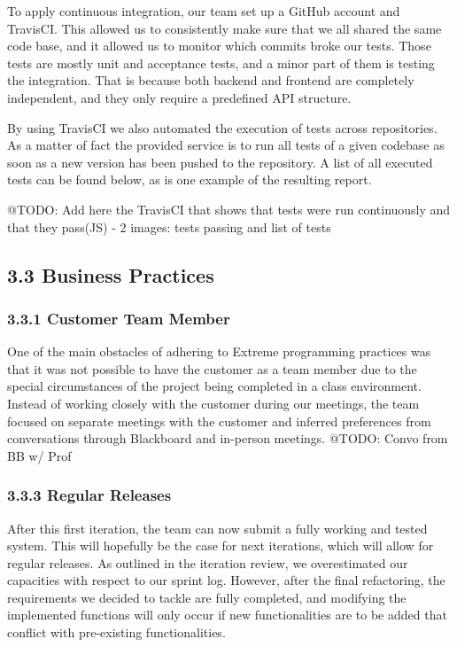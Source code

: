 \documentclass[]{article}
\begin{document}
To apply continuous integration, our team set up a GitHub account and
TravisCI. This allowed us to consistently make sure that we all shared
the same code base, and it allowed us to monitor which commits broke our
tests. Those tests are mostly unit and acceptance tests, and a minor
part of them is testing the integration. That is because both backend
and frontend are completely independent, and they only require a
predefined API structure.

By using TravisCI we also automated the execution of tests across
repositories. As a matter of fact the provided service is to run all
tests of a given codebase as soon as a new version has been pushed to
the repository. A list of all executed tests can be found below, as is
one example of the resulting report.

@TODO: Add here the TravisCI that shows that tests were run continuously
and that they pass(JS) - 2 images: tests passing and list of tests

\subsection{3.3 Business Practices}\label{business-practices}

\subsubsection{3.3.1 Customer Team Member}\label{customer-team-member}

One of the main obstacles of adhering to Extreme programming practices
was that it was not possible to have the customer as a team member due
to the special circumstances of the project being completed in a class
environment. Instead of working closely with the customer during our
meetings, the team focused on separate meetings with the customer and
inferred preferences from conversations through Blackboard and in-person
meetings. @TODO: Convo from BB w/ Prof

\subsubsection{3.3.3 Regular Releases}\label{regular-releases}

After this first iteration, the team can now submit a fully working and
tested system. This will hopefully be the case for next iterations,
which will allow for regular releases. As outlined in the iteration
review, we overestimated our capacities with respect to our sprint log.
However, after the final refactoring, the requirements we decided to
tackle are fully completed, and modifying the implemented functions will
only occur if new functionalities are to be added that conflict with
pre-existing functionalities.
\end{document}
